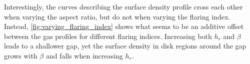       Interestingly, the curves describing the surface density profile cross 
      each other when varying the aspect ratio, but do not when varying the 
      flaring index. Instead, \autoref{fig:varying_flaring_index} shows what 
      seems to be an additive offset between the gas profiles for different 
      flaring indices. Increasing both $h_r$ and $\beta$ leads to a shallower 
      gap, yet the surface density in disk regions around the gap grows 
      with $\beta$ and falls when increasing $h_r$. \\
      \\

